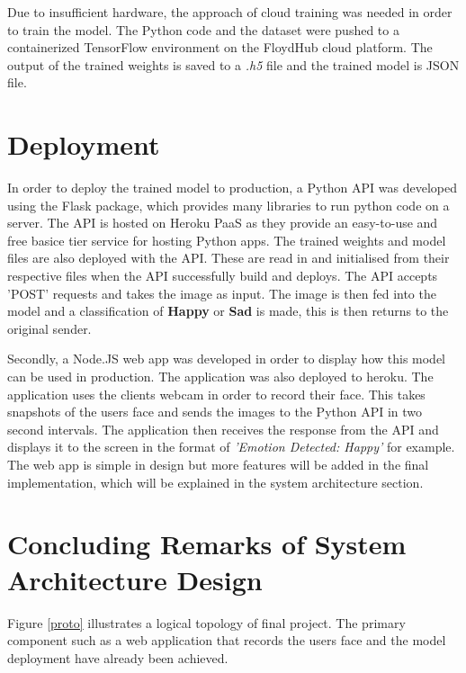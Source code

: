 Due to insufficient hardware, the approach of cloud training was needed in order to train the model. The Python code and the dataset were pushed to a containerized TensorFlow environment on the FloydHub cloud platform. The output of the trained weights is saved to a \textit{.h5} file and the trained model is JSON file.


\section{Deployment}
In order to deploy the trained model to production, a Python API was developed using the Flask package, which provides many libraries to run python code on a server. The API is hosted on Heroku PaaS as they provide an easy-to-use and free basice tier service for hosting Python apps. The trained weights and model files are also deployed with the API. These are read in and initialised from their respective files when the API successfully build and deploys. The API accepts 'POST' requests and takes the image as input. The image is then fed into the model and a classification of \textbf{Happy} or \textbf{Sad} is made, this is then returns to the original sender.

Secondly, a Node.JS web app was developed in order to display how this model can be used in production. The application was also deployed to heroku. The application uses the clients webcam in order to record their face. This takes snapshots of the users face and sends the images to the Python API in two second intervals. The application then receives the response from the API and displays it to the screen in the format of \textit{'Emotion Detected: Happy'} for example. The web app is simple in design but more features will be added in the final implementation, which will be explained in the system architecture section.


\section{Concluding Remarks of System Architecture Design}
Figure \ref{proto} illustrates a logical topology of final project. The primary component such as a web application that records the users face and the model deployment have already been achieved.\\

